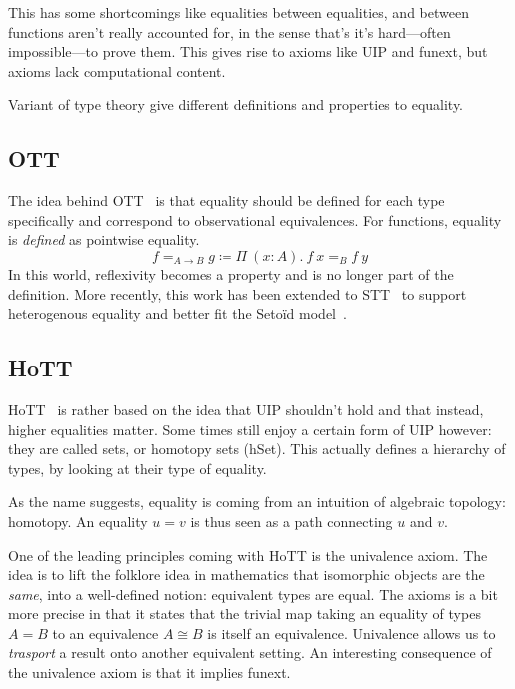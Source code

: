 This has some shortcomings like equalities between equalities, and between
functions aren't really accounted for, in the sense that's it's hard---often
impossible---to prove them.
This gives rise to axioms like \acrshort{UIP} and \acrshort{funext}, but axioms
lack computational content.

Variant of type theory give different definitions and properties to equality.

\subsection{\acrfull{OTT}}

The idea behind \acrshort{OTT}~ is that
equality should be defined for each type specifically and correspond to
observational equivalences. For functions, equality is \emph{defined} as
pointwise equality.
\[
  f =_{A \to B} g \coloneqq \Pi\ (x : A).\ f\ x =_B f\ y
\]
In this world, reflexivity becomes a property and is no longer part of the
definition.
More recently, this work has been extended to
\acrfull{STT}~ to support heterogenous equality
and better fit the Setoïd model~.

\subsection{\acrfull{HoTT}}

\acrshort{HoTT}~ is rather based on the idea that
\acrshort{UIP} shouldn't hold and that instead, higher equalities matter.
Some times still enjoy a certain form of \acrshort{UIP} however: they are called
sets, or homotopy sets (hSet). This actually defines a hierarchy of types, by
looking at their type of equality.

As the name suggests, equality is coming from an intuition of algebraic
topology: homotopy. An equality \(u = v\) is thus seen as a path connecting
\(u\) and \(v\).

 One of the leading principles coming with \acrshort{HoTT}
is the univalence axiom. The idea is to lift the folklore idea in mathematics
that isomorphic objects are the \emph{same}, into a well-defined notion:
equivalent types are equal.
The axioms is a bit more precise in that it states that the trivial map
taking an equality of types \(A = B\) to an equivalence \(A \cong B\)
is itself an equivalence.
Univalence allows us to \emph{trasport} a result onto another equivalent
setting.
An interesting consequence of the univalence axiom is that it implies
\acrshort{funext}.

